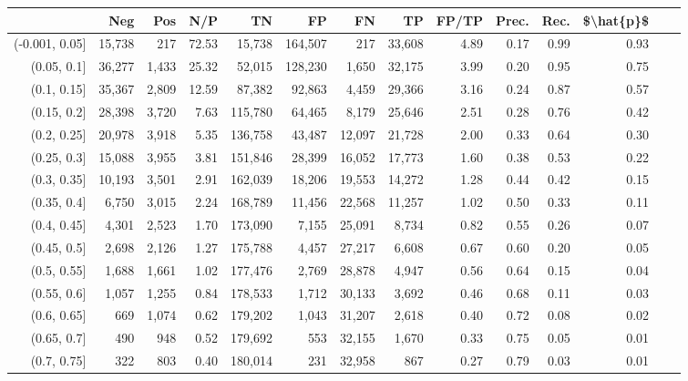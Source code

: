 \begin{tabular}{rrrrrrrrrrrrrr}
\toprule
{} &     Neg &    Pos &    N/P &       TN &       FP &      FN &      TP & FP/TP & Prec. &  Rec. & \$\textbackslash hat\{p\}\$ \\
\midrule
(-0.001, 0.05] &  15,738 &    217 &  72.53 &   15,738 &  164,507 &     217 &  33,608 &  4.89 &  0.17 &  0.99 &      0.93 \\
(0.05, 0.1]    &  36,277 &  1,433 &  25.32 &   52,015 &  128,230 &   1,650 &  32,175 &  3.99 &  0.20 &  0.95 &      0.75 \\
(0.1, 0.15]    &  35,367 &  2,809 &  12.59 &   87,382 &   92,863 &   4,459 &  29,366 &  3.16 &  0.24 &  0.87 &      0.57 \\
(0.15, 0.2]    &  28,398 &  3,720 &   7.63 &  115,780 &   64,465 &   8,179 &  25,646 &  2.51 &  0.28 &  0.76 &      0.42 \\
(0.2, 0.25]    &  20,978 &  3,918 &   5.35 &  136,758 &   43,487 &  12,097 &  21,728 &  2.00 &  0.33 &  0.64 &      0.30 \\
(0.25, 0.3]    &  15,088 &  3,955 &   3.81 &  151,846 &   28,399 &  16,052 &  17,773 &  1.60 &  0.38 &  0.53 &      0.22 \\
(0.3, 0.35]    &  10,193 &  3,501 &   2.91 &  162,039 &   18,206 &  19,553 &  14,272 &  1.28 &  0.44 &  0.42 &      0.15 \\
(0.35, 0.4]    &   6,750 &  3,015 &   2.24 &  168,789 &   11,456 &  22,568 &  11,257 &  1.02 &  0.50 &  0.33 &      0.11 \\
(0.4, 0.45]    &   4,301 &  2,523 &   1.70 &  173,090 &    7,155 &  25,091 &   8,734 &  0.82 &  0.55 &  0.26 &      0.07 \\
(0.45, 0.5]    &   2,698 &  2,126 &   1.27 &  175,788 &    4,457 &  27,217 &   6,608 &  0.67 &  0.60 &  0.20 &      0.05 \\
(0.5, 0.55]    &   1,688 &  1,661 &   1.02 &  177,476 &    2,769 &  28,878 &   4,947 &  0.56 &  0.64 &  0.15 &      0.04 \\
(0.55, 0.6]    &   1,057 &  1,255 &   0.84 &  178,533 &    1,712 &  30,133 &   3,692 &  0.46 &  0.68 &  0.11 &      0.03 \\
(0.6, 0.65]    &     669 &  1,074 &   0.62 &  179,202 &    1,043 &  31,207 &   2,618 &  0.40 &  0.72 &  0.08 &      0.02 \\
(0.65, 0.7]    &     490 &    948 &   0.52 &  179,692 &      553 &  32,155 &   1,670 &  0.33 &  0.75 &  0.05 &      0.01 \\
(0.7, 0.75]    &     322 &    803 &   0.40 &  180,014 &      231 &  32,958 &     867 &  0.27 &  0.79 &  0.03 &      0.01 \\

\end{tabular}
